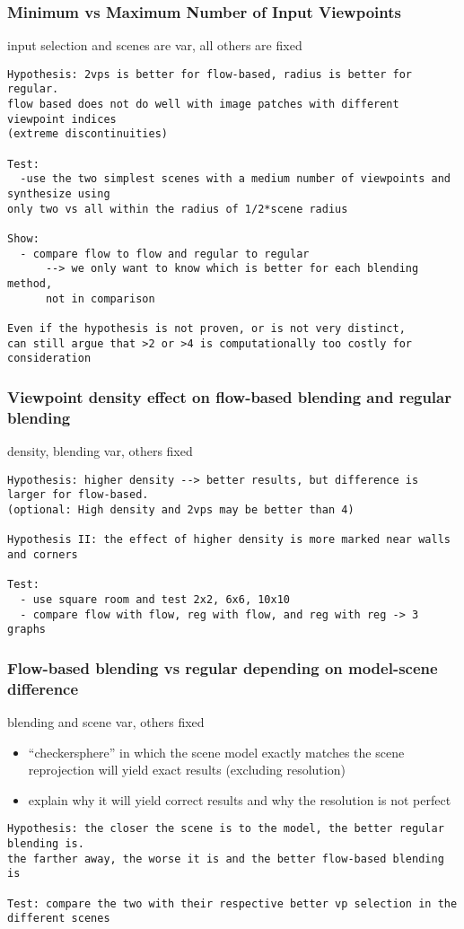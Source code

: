 \subsubsection{Minimum vs Maximum Number of Input Viewpoints}
input selection and scenes are var, all others are fixed
\begin{verbatim}
Hypothesis: 2vps is better for flow-based, radius is better for regular.
flow based does not do well with image patches with different viewpoint indices
(extreme discontinuities)

Test: 
  -use the two simplest scenes with a medium number of viewpoints and synthesize using
only two vs all within the radius of 1/2*scene radius

Show: 
  - compare flow to flow and regular to regular
      --> we only want to know which is better for each blending method,
      not in comparison

Even if the hypothesis is not proven, or is not very distinct,
can still argue that >2 or >4 is computationally too costly for consideration

\end{verbatim}

\subsubsection{Viewpoint density effect on flow-based blending and regular blending}
density, blending var, others fixed
\begin{verbatim}
Hypothesis: higher density --> better results, but difference is larger for flow-based.
(optional: High density and 2vps may be better than 4)

Hypothesis II: the effect of higher density is more marked near walls and corners

Test:
  - use square room and test 2x2, 6x6, 10x10
  - compare flow with flow, reg with flow, and reg with reg -> 3 graphs

\end{verbatim}

\subsubsection{Flow-based blending vs regular depending on model-scene difference}
blending and scene var, others fixed
\begin{itemize}
  \item ``checkersphere'' in which the scene model exactly matches the scene
    \ar reprojection will yield exact results (excluding resolution)
  \item explain why it will yield correct results and why the resolution is not perfect
\end{itemize}
\begin{verbatim}
Hypothesis: the closer the scene is to the model, the better regular blending is.
the farther away, the worse it is and the better flow-based blending is

Test: compare the two with their respective better vp selection in the different scenes

\end{verbatim}


